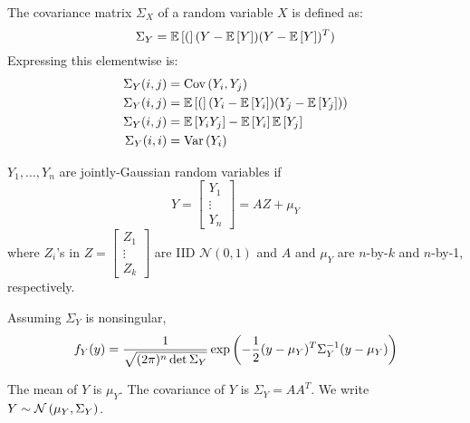 \begin{definition}
    The covariance matrix $\Sigma_X$ of a random variable $X$ is defined as:
    \[ \Sigma_Y = \mathbb{E}\left[ ( \right](Y - \mathbb{E}\left[ Y \right])(Y - \mathbb{E}\left[ Y \right])^T) \]
    Expressing this elementwise is:
    \begin{align*}
        \Sigma_Y(i, j) &= \text{Cov}\left( Y_i, Y_j \right) \\
        \Sigma_Y(i, j) &= \mathbb{E}\left[ ( \right](Y_i - \mathbb{E}\left[ Y_i \right])(Y_j - \mathbb{E}\left[ Y_j \right])) \\
        \Sigma_Y(i, j) &= \mathbb{E}\left[ Y_i Y_j \right] - \mathbb{E}\left[ Y_i \right] \mathbb{E}\left[ Y_j \right] \\
        \Sigma_Y(i, i) &= \text{Var}\left( Y_i \right)
    \end{align*}
\end{definition}

\begin{definition}[J-G RVs]
    $Y_1, \dots, Y_n$ are jointly-Gaussian random variables if 
    \[Y = \begin{bmatrix}
        Y_1 \\ \vdots \\ Y_n
    \end{bmatrix} = AZ + \mu_Y\]
    where $Z_i$'s in $Z = \begin{bmatrix}
        Z_1 \\ \vdots \\ Z_k
    \end{bmatrix}$ are IID $\mathcal{N}(0, 1)$ and $A$ and $\mu_Y$ are $n$-by-$k$ and $n$-by-1, respectively.
\end{definition}

\begin{theorem}
    Assuming $\Sigma_Y$ is nonsingular,
    \[ f_Y(y) = \frac{1}{\sqrt{(2 \pi)^n \det \Sigma_Y}} \exp\qty(-\frac{1}{2} (y - \mu_Y)^T \Sigma_Y^{-1} (y - \mu_Y)) \]
\end{theorem}

\begin{theorem}
    The mean of $Y$ is $\mu_Y$. The covariance of $Y$ is $\Sigma_Y = A A^T$. We write $Y \sim \mathcal{N}\left( \mu_Y, \Sigma_Y \right)$.
\end{theorem}

